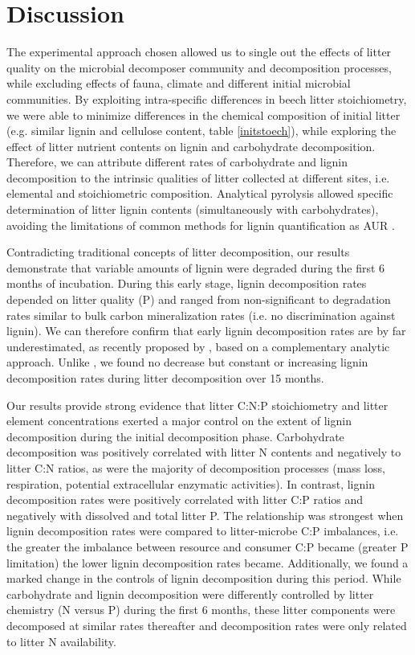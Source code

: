 \section*{Discussion}

The experimental approach chosen allowed us to single out the effects of litter quality on the microbial decomposer community and decomposition processes, while excluding effects of fauna, climate and different initial microbial communities. By exploiting intra-specific differences in beech litter stoichiometry, we were able to minimize differences in the chemical composition of initial litter (e.g. similar lignin and cellulose content, table \ref{initstoech}), while exploring the effect of litter nutrient contents on lignin and carbohydrate decomposition. Therefore, we can attribute different rates of carbohydrate and lignin decomposition to the intrinsic qualities of litter collected at different sites, i.e. elemental and stoichiometric composition. Analytical pyrolysis allowed specific determination of litter lignin contents (simultaneously with carbohydrates), avoiding the limitations of common methods for lignin quantification as AUR \cite{Hatfield2005}.

Contradicting traditional concepts of litter decomposition, our results demonstrate that variable amounts of lignin were degraded during the first 6 months of incubation. During this early stage, lignin decomposition rates depended on litter quality (P) and ranged from non-significant to degradation rates similar to bulk carbon mineralization rates (i.e. no discrimination against lignin). We can therefore confirm that early lignin decomposition rates are by far underestimated, as recently proposed by \cite{Klotzbucher2011}, based on a complementary analytic approach. Unlike \cite{Klotzbucher2011}, we found no decrease but constant or increasing lignin decomposition rates during litter decomposition over 15 months. 

Our results provide strong evidence that litter C:N:P stoichiometry and litter element concentrations exerted a major control on the extent of lignin decomposition during the initial decomposition phase. Carbohydrate decomposition was positively correlated with litter N contents and negatively to litter C:N ratios, as were the majority of decomposition processes (mass loss, respiration, potential extracellular enzymatic activities). In contrast, lignin decomposition rates were positively correlated with litter C:P ratios and negatively with dissolved and total litter P. The relationship was strongest when lignin decomposition rates were compared to litter-microbe C:P imbalances, i.e. the greater the imbalance between resource and consumer C:P became (greater P limitation) the lower lignin decomposition rates became. Additionally, we found a marked change in the controls of lignin decomposition during this period. While carbohydrate and lignin decomposition were differently controlled by litter chemistry (N versus P) during the first 6 months, these litter components were decomposed at similar rates thereafter and decomposition rates were only related to litter N availability. 

